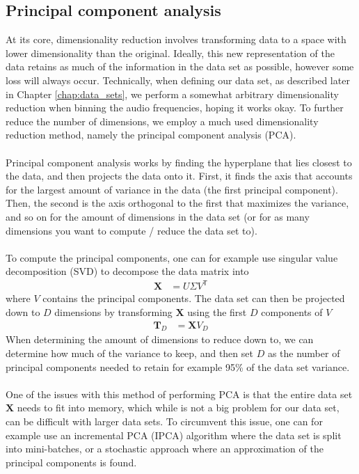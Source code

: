 \documentclass[a4paper]{article}
\newcommand{\XX}{\mathbf{X}}
\newcommand{\T}{\mathsf{T}}
\begin{document}
\subsection{Principal component analysis} \label{sec:pca}
At its core, dimensionality reduction involves transforming data to a space with lower dimensionality than the original. Ideally, this new representation of the data retains as much of the information in the data set as possible, however some loss will always occur. Technically, when defining our data set, as described later in Chapter \ref{chap:data_sets}, we perform a somewhat arbitrary dimensionality reduction when binning the audio frequencies, hoping it works okay. To further reduce the number of dimensions, we employ a much used dimensionality reduction method, namely the principal component analysis (PCA).
\\\\
Principal component analysis works by finding the hyperplane that lies closest to the data, and then projects the data onto it. First, it finds the axis that accounts for the largest amount of variance in the data (the first principal component). Then, the second is the axis orthogonal to the first that maximizes the variance, and so on for the amount of dimensions in the data set (or for as many dimensions you want to compute / reduce the data set to).
\\\\
To compute the principal components, one can for example use singular value decomposition (SVD) to decompose the data matrix into
\begin{align*}
	\XX &= U\Sigma V^\T
\end{align*}
where $V$ contains the principal components. The data set can then be projected down to $D$ dimensions by transforming $\XX$ using the first $D$ components of $V$
\begin{align*}
	\mathbf{T}_D &= \XX V_D
\end{align*}
When determining the amount of dimensions to reduce down to, we can determine how much of the variance to keep, and then set $D$ as the number of principal components needed to retain for example 95\% of the data set variance.
\\\\
One of the issues with this method of performing PCA is that the entire data set $\XX$ needs to fit into memory, which while is not a big problem for our data set, can be difficult with larger data sets. To circumvent this issue, one can for example use an incremental PCA (IPCA) algorithm where the data set is split into mini-batches, or a stochastic approach where an approximation of the principal components is found.
\end{document}
